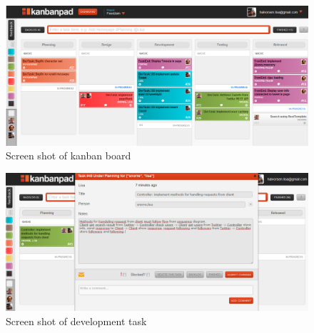 \begin{figure}[ht]
    \begin{minipage}[b]{1\linewidth}
        \centering
        \includegraphics[width=1\textwidth]{figures/130512}
        \caption{Screen shot of kanban board }
        \label{fig:kanbanScreenShot}
    \end{minipage}
\end{figure}



\begin{figure}[ht]
    \begin{minipage}[b]{1\linewidth}
        \centering
        \includegraphics[width=1\textwidth]{figures/ajajcontroller}
        \caption{Screen shot of development task}
        \label{fig:kanbanScreenShotDevTask}
    \end{minipage}
\end{figure}